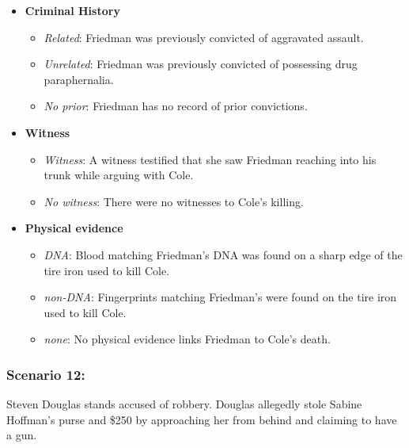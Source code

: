 \documentclass[
]{article}
\providecommand{\tightlist}{%
  \setlength{\itemsep}{0pt}\setlength{\parskip}{0pt}}
\begin{document}
\begin{itemize}
\tightlist
\item
  \textbf{Criminal History}

  \begin{itemize}
  \tightlist
  \item
    \emph{Related}: Friedman was previously convicted of aggravated
    assault.
  \item
    \emph{Unrelated}: Friedman was previously convicted of possessing
    drug paraphernalia.
  \item
    \emph{No prior}: Friedman has no record of prior convictions.
  \end{itemize}
\item
  \textbf{Witness}

  \begin{itemize}
  \tightlist
  \item
    \emph{Witness}: A witness testified that she saw Friedman reaching
    into his trunk while arguing with Cole.
  \item
    \emph{No witness}: There were no witnesses to Cole's killing.
  \end{itemize}
\item
  \textbf{Physical evidence}

  \begin{itemize}
  \tightlist
  \item
    \emph{DNA}: Blood matching Friedman's DNA was found on a sharp edge
    of the tire iron used to kill Cole.
  \item
    \emph{non-DNA}: Fingerprints matching Friedman's were found on the
    tire iron used to kill Cole.
  \item
    \emph{none}: No physical evidence links Friedman to Cole's death.
  \end{itemize}
\end{itemize}

\hypertarget{scenario-12}{%
\subsubsection{Scenario 12:}\label{scenario-12}}

Steven Douglas stands accused of robbery. Douglas allegedly stole Sabine
Hoffman's purse and \$250 by approaching her from behind and claiming to
have a gun.
\end{document}
